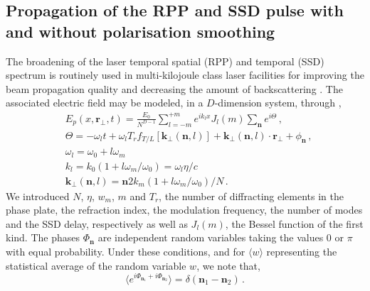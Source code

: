 \documentclass[
 reprint,
 amsmath,amssymb,
 aps,
]{revtex4-1}
\begin{document}
\subsection{Propagation of the RPP and  SSD pulse with and without polarisation smoothing}
The broadening of the  laser temporal spatial (RPP) and temporal (SSD) spectrum \cite{Kato_1984,Skupski_1989} is  routinely used in multi-kilojoule class laser facilities for improving the beam propagation quality \cite[]{NatPhys_Glenzer,NatPhys_Labaune,POP_Delamater_2000} and decreasing the amount of backscattering \cite[]{POP_Duluc_2019}. 
The associated electric field may be modeled, in a $D$-dimension system,  through \cite[]{POP_Rose_98,Rothenberg_97,Videau_1999}, 
\begin{align}
    &E_p(x,\mathbf{r}_\perp,t) =\frac{E_0}{N^{D-1}} \sum_{l=-m}^{+m}  e^{i k_l x }J_l(m) \sum_{\mathbf{n} }  
    e^{i\Theta}
    \, , \label{eq:essd}  \\
   & \Theta = -\omega_lt +\omega_l T_{r} f_{T/L}[\mathbf{k}_\perp(\mathbf{n},l)] + \mathbf{k}_\perp(\mathbf{n},l)\cdot \mathbf{r}_\perp +\phi_{\mathbf{n}} \, ,\\
   & \omega_l= \omega_0+l \omega_m \\
   & k_l = k_0(1+l\omega_m/\omega_0 ) = \omega_l\eta /c \\
    &\mathbf{k}_{\perp }( \mathbf{n},l)= \mathbf{n}  2k_m(1+l\omega_m/\omega_0 )/N\, .\label{eq:kp}
\end{align}
We introduced $N$, $\eta$, $ w_m$, $m$ and $T_{r}$, the number of diffracting elements in the phase plate, the refraction index, the modulation frequency, the number of modes and the SSD delay, respectively as well as  $J_l(m)$, the Bessel function of the first kind.
The phases $\Phi_{\mathbf{n}}$ are independent random variables taking the values $0$ or $\pi$ with equal probability.
Under these conditions, and for $\langle w\rangle$ representing the statistical average of the random variable $w$,   we note   that,
 \begin{equation}\label{eq:d}
 \langle e^{i\Phi_{\mathbf{n}_1}+i\Phi_{\mathbf{n}_2}}\rangle=\delta(\mathbf{n}_1-\mathbf{n}_2) \, .
 \end{equation}
 
\end{document}
